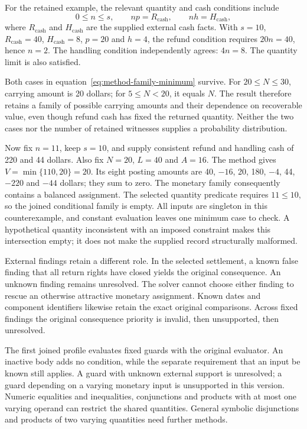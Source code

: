For the retained example, the relevant quantity and cash conditions include
\begin{equation}
\label{eq:method-family-selected-conditions}
 0\leq n\leq s,\qquad np=R_{\mathrm{cash}},\qquad
 nh=H_{\mathrm{cash}},
\end{equation}
where \(R_{\mathrm{cash}}\) and \(H_{\mathrm{cash}}\) are the supplied
external cash facts. With \(s=10\), \(R_{\mathrm{cash}}=40\),
\(H_{\mathrm{cash}}=8\), \(p=20\) and \(h=4\), the refund condition
requires \(20n=40\), hence \(n=2\). The handling condition independently
agrees: \(4n=8\). The quantity limit is also satisfied.

Both cases in equation~\eqref{eq:method-family-minimum} survive. For
\(20\leq N\leq30\), carrying amount is 20 dollars; for
\(5\leq N<20\), it equals \(N\). The result therefore retains a family
of possible carrying amounts and their dependence on recoverable value, even
though refund cash has fixed the returned quantity. Neither the two cases nor
the number of retained witnesses supplies a probability distribution.

Now fix \(n=11\), keep \(s=10\), and supply consistent refund and handling
cash of 220 and 44 dollars. Also fix \(N=20\), \(L=40\) and \(A=16\).
The method gives \(V=\min\{110,20\}=20\). Its eight posting amounts are
40, \(-16\), 20, 180, \(-4\), 44, \(-220\) and \(-44\) dollars;
they sum to zero. The monetary family consequently contains a balanced
assignment. The selected quantity predicate requires \(11\leq10\), so
the joined conditional family is empty. All inputs are singleton in this
counterexample, and constant evaluation leaves one minimum case to check.
A hypothetical quantity inconsistent with an imposed constraint makes this
intersection empty; it does not make the supplied record structurally malformed.

External findings retain a different role. In the selected settlement, a known
false finding that all return rights have closed yields the original
 consequence. An unknown finding remains unresolved.
The solver cannot choose either finding to rescue an otherwise attractive
monetary assignment. Known dates and component identifiers likewise retain
the exact original comparisons. Across fixed findings the original consequence
priority is invalid, then unsupported, then unresolved.

The first joined profile evaluates fixed guards with the original evaluator.
An inactive body adds no condition, while the separate requirement that an
input be known still applies. A guard with unknown external support is
unresolved; a guard depending on a varying monetary input is unsupported in
this version. Numeric equalities and inequalities, conjunctions and products
with at most one varying operand can restrict the shared quantities.
General symbolic disjunctions and products of two varying quantities need
further methods.

